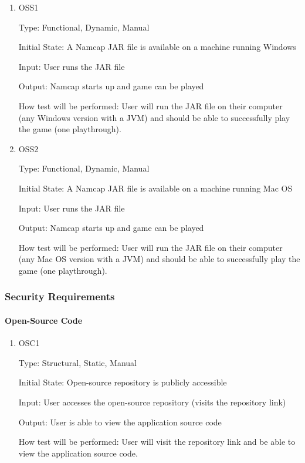 \documentclass[12pt, titlepage]{article}
\begin{document}
\begin{enumerate}

\item{OSS1\\}

Type: Functional, Dynamic, Manual
					
Initial State: A Namcap JAR file is available on a machine running Windows
					
Input: User runs the JAR file
					
Output: Namcap starts up and game can be played
					
How test will be performed: User will run the JAR file on their computer (any Windows version with a JVM) and should be able to successfully play the game (one playthrough).

\item{OSS2\\}

Type: Functional, Dynamic, Manual
					
Initial State: A Namcap JAR file is available on a machine running Mac OS
					
Input: User runs the JAR file
					
Output: Namcap starts up and game can be played
					
How test will be performed: User will run the JAR file on their computer (any Mac OS version with a JVM) and should be able to successfully play the game (one playthrough).

\end{enumerate}

\subsubsection{Security Requirements}

\paragraph{Open-Source Code}

\begin{enumerate}

\item{OSC1\\}

Type: Structural, Static, Manual
					
Initial State: Open-source repository is publicly accessible
					
Input: User accesses the open-source repository (visits the repository link)
					
Output: User is able to view the application source code
					
How test will be performed: User will visit the repository link and be able to view the application source code.

\end{enumerate}
\end{document}
